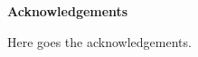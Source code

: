 \begin{center}
\textbf{\large Acknowledgements}
\end{center}

Here goes the acknowledgements.

\vspace{1cm}

\hfill
